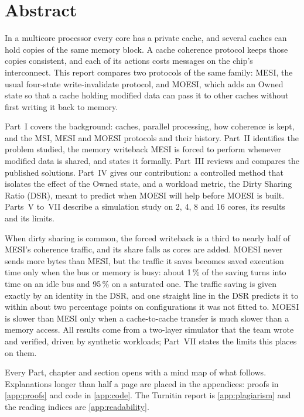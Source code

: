 \documentclass[11pt,a4paper,oneside]{report}
\begin{document}
\clearpage
\chapter*{Abstract}

In a multicore processor every core has a private cache, and several caches can
hold copies of the same memory block. A cache coherence protocol keeps those copies
consistent, and each of its actions costs messages on the chip's interconnect. This
report compares two protocols of the same family: MESI, the usual four-state
write-invalidate protocol, and MOESI, which adds an Owned state so that a cache
holding modified data can pass it to other caches without first writing it back to
memory.

Part~I covers the background: caches, parallel processing, how coherence is kept,
and the MSI, MESI and MOESI protocols and their history. Part~II identifies the
problem studied, the memory writeback MESI is forced to perform whenever modified
data is shared, and states it formally. Part~III reviews and compares the published
solutions. Part~IV gives our contribution: a controlled method that isolates the
effect of the Owned state, and a workload metric, the Dirty Sharing Ratio (DSR),
meant to predict when MOESI will help before MOESI is built. Parts~V to~VII describe
a simulation study on 2, 4, 8 and 16 cores, its results and its limits.

When dirty sharing is common, the forced writeback is a third to nearly half of
MESI's coherence traffic, and its share falls as cores are added. MOESI never sends
more bytes than MESI, but the traffic it saves becomes saved execution time only
when the bus or memory is busy: about 1\,\% of the saving turns into time on an idle
bus and 95\,\% on a saturated one. The traffic saving is given exactly by an identity
in the DSR, and one straight line in the DSR predicts it to within about two
percentage points on configurations it was not fitted to. MOESI is slower than MESI
only when a cache-to-cache transfer is much slower than a memory access. All results
come from a two-layer simulator that the team wrote and verified, driven by synthetic
workloads; Part~VII states the limits this places on them.

\begin{remarkbox}
Every Part, chapter and section opens with a mind map of what follows. Explanations
longer than half a page are placed in the appendices: proofs in
\cref{app:proofs} and code in \cref{app:code}. The Turnitin report is
\cref{app:plagiarism} and the reading indices are \cref{app:readability}.
\end{remarkbox}
\end{document}
